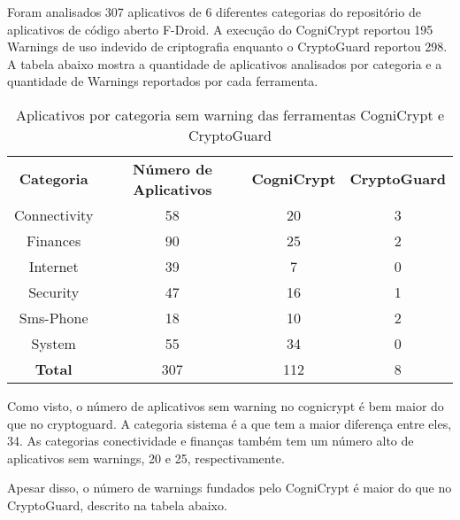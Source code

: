Foram analisados 307 aplicativos de 6 diferentes categorias do repositório de aplicativos de código aberto F-Droid.
A execução do CogniCrypt reportou 195 Warnings de uso indevido de criptografia enquanto o CryptoGuard reportou 298.
A tabela abaixo mostra a quantidade de aplicativos analisados por categoria e a quantidade de Warnings reportados por cada ferramenta.

\begin{table}[!htbp]
  \centering
  \begin{tabular}{|c|c|c|c|}
  
    \textbf{Categoria}   & \textbf{Número de Aplicativos}   &  \textbf{CogniCrypt}     &  \textbf{CryptoGuard} \\ 
     Connectivity           & \num{58}                         &  \num{20}                    & \num{3}                     \\
Finances                & \num{90}                         &  \num{25}                    & \num{2}                     \\
Internet                 & \num{39}                         &  \num{7}                      &     \num{0}                  \\
Security                 & \num{47}                         &  \num{16}                    &     \num{1}                  \\
Sms-Phone            & \num{18}                         &  \num{10}                     &     \num{2}                 \\
System                  & \num{55}                        &   \num{34}                    &     \num{0}                  \\
\textbf{Total}        & \num{307}                      &   \num{112}                  &     \num{8}                   \\
\end{tabular}
    
  \caption{Aplicativos por categoria sem warning das ferramentas CogniCrypt e CryptoGuard}
\label{AplicativosSemWarning}
\end{table}

Como visto, o número de aplicativos sem warning no cognicrypt é bem maior do que no cryptoguard. A categoria sistema é a que tem a maior diferença entre eles, \num{34}. As categorias conectividade e finanças também tem um número alto de aplicativos sem warnings, \num{20} e \num{25}, respectivamente.

Apesar disso, o número de warnings fundados pelo CogniCrypt é maior do que no CryptoGuard, descrito na tabela abaixo.

